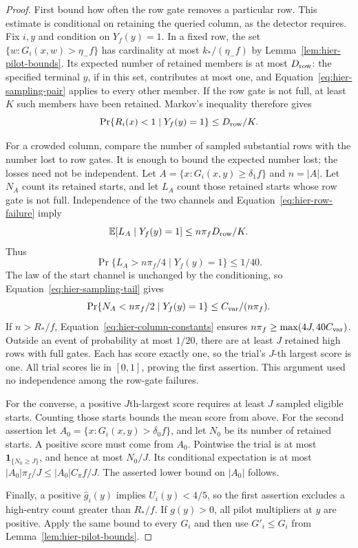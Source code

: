 \begin{proof}
First bound how often the row gate removes a particular row. This estimate is conditional on retaining the queried column, as the detector requires. Fix $i,y$ and condition on $Y_f(y)=1$.  In a fixed row, the set
$\{w:G_i(x,w)>\eta_-f\}$ has cardinality at most
$k_*/(\eta_-f)$ by Lemma~\ref{lem:hier-pilot-bounds}.
Its expected number of retained members is at most $D_{\rm row}$:
the specified terminal $y$, if in this set, contributes at most one,
and Equation~\eqref{eq:hier-sampling-pair} applies to every other member.
If the row gate is not full, at least $K$ such members have been retained.
Markov's inequality therefore gives
\begin{equation}
 \Pr\{R_i(x)<1\mid Y_f(y)=1\}\leq D_{\rm row}/K.
 \label{eq:hier-row-failure}
\end{equation}

For a crowded column, compare the number of sampled substantial rows with the number lost to row gates. It is enough to bound the expected number lost; the losses need not be independent. Let $A=\{x:G_i(x,y)\geq\delta_1f\}$ and $n=|A|$.
Let $N_A$ count its retained starts, and let $L_A$ count those retained
starts whose row gate is not full.  Independence of the two channels
and Equation~\eqref{eq:hier-row-failure} imply
\[
 \mathbb E[L_A\mid Y_f(y)=1]\leq n\pi_fD_{\rm row}/K.
\]
Thus
\[
 \Pr\{L_A>n\pi_f/4\mid Y_f(y)=1\}\leq1/40.
\]
The law of the start channel is unchanged by the conditioning, so
Equation~\eqref{eq:hier-sampling-tail} gives
\[
 \Pr\{N_A<n\pi_f/2\mid Y_f(y)=1\}
       \leq C_{\rm var}/(n\pi_f).
\]
If $n>R_*/f$, Equation~\eqref{eq:hier-column-constants} ensures
$n\pi_f\geq\max(4J,40C_{\rm var})$.  Outside an event of probability
at most $1/20$, there are at least $J$ retained high rows with full
gates.  Each has score exactly one, so the trial's $J$-th largest score
is one.  All trial scores lie in $[0,1]$, proving the first assertion.
This argument used no independence among the row-gate failures.

For the converse, a positive $J$th-largest score requires at least $J$ sampled eligible starts. Counting those starts bounds the mean score from above. For the second assertion let
$A_0=\{x:G_i(x,y)>\delta_0f\}$, and let $N_0$ be its number of
retained starts.  A positive score must come from $A_0$.  Pointwise the
trial is at most $\mathbf 1_{\{N_0\geq J\}}$, and hence at most
$N_0/J$.  Its conditional expectation is at most
$|A_0|\pi_f/J\leq |A_0|C_\pi f/J$.  The asserted lower bound on
$|A_0|$ follows.

Finally, a positive $\widehat g_i(y)$ implies $U_i(y)<4/5$, so the
first assertion excludes a high-entry count greater than $R_*/f$.
If $g(y)>0$, all pilot multipliers at $y$ are positive.  Apply the
same bound to every $G_i$ and then use $G'_i\leq G_i$ from
Lemma~\ref{lem:hier-pilot-bounds}.
\end{proof}

